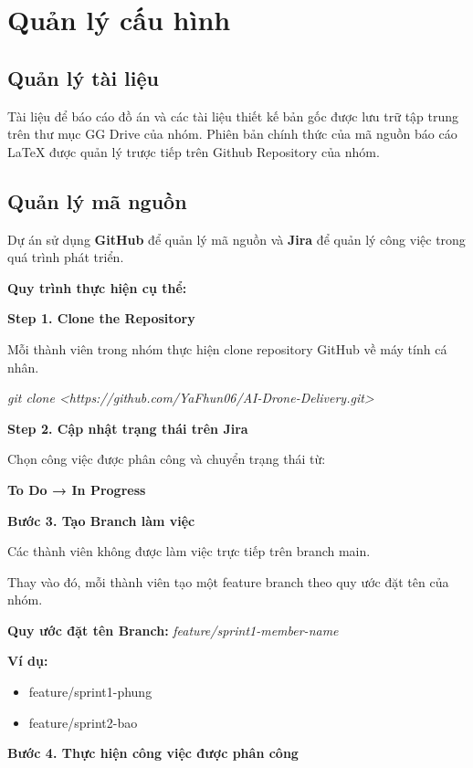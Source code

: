 \section{Quản lý cấu hình}

\subsection{Quản lý tài liệu}

Tài liệu để báo cáo đồ án và các tài liệu thiết kế bản gốc được lưu trữ tập trung trên thư mục GG Drive của nhóm. Phiên bản chính thức của mã nguồn báo cáo LaTeX được quản lý trược tiếp trên Github Repository của nhóm.

\subsection{Quản lý mã nguồn}

Dự án sử dụng \textbf{GitHub} để quản lý mã nguồn và \textbf{Jira} để quản lý công việc trong quá trình phát triển.

\textbf{Quy trình thực hiện cụ thể:}

\textbf{Step 1. Clone the Repository}

Mỗi thành viên trong nhóm thực hiện clone repository GitHub về máy tính cá nhân.

\emph{git clone \textless https://github.com/YaFhun06/AI-Drone-Delivery.git\textgreater{}}

\textbf{Step 2. Cập nhật trạng thái trên Jira}

Chọn công việc được phân công và chuyển trạng thái từ:

\textbf{To Do → In Progress}

\textbf{Bước 3. Tạo Branch làm việc}

Các thành viên không được làm việc trực tiếp trên branch main.

Thay vào đó, mỗi thành viên tạo một feature branch theo quy ước đặt tên của nhóm.

\textbf{Quy ước đặt tên Branch:} \emph{feature/sprint1-member-name}

\textbf{Ví dụ:}

\begin{itemize}
\item
  feature/sprint1-phung
\item
  feature/sprint2-bao
\end{itemize}

\textbf{Bước 4. Thực hiện công việc được phân công}


